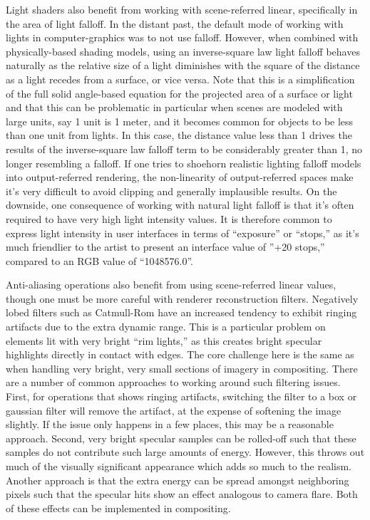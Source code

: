 Light shaders also benefit from working with scene-referred linear, specifically in the area of light falloff. In the distant past, the default mode of working with lights in computer-graphics was to not use falloff. However, when combined with physically-based shading models, using an inverse-square law light falloff behaves naturally as the relative size of a light diminishes with the square of the distance as a light recedes from a surface, or vice versa. Note that this is a simplification of the full solid angle-based equation for the projected area of a surface or light and that this can be problematic in particular when scenes are modeled with large units, say 1 unit is 1 meter, and it becomes common for objects to be less than one unit from lights. In this case, the distance value less than 1 drives the results of the inverse-square law falloff term to be considerably greater than 1, no longer resembling a falloff. If one tries to shoehorn realistic lighting falloff models into output-referred rendering, the non-linearity of output-referred spaces make it’s very difficult to avoid clipping and generally implausible results. On the downside, one consequence of working with natural light falloff is that it’s often required to have very high light intensity values. It is therefore common to express light intensity in user interfaces in terms of “exposure” or “stops,” as it’s much friendlier to the artist to present an interface value of ”+20 stops,” compared to an RGB value of “1048576.0”.

Anti-aliasing operations also benefit from using scene-referred linear values, though one must be more careful with renderer reconstruction filters. Negatively lobed filters such as Catmull-Rom have an increased tendency to exhibit ringing artifacts due to the extra dynamic range. This is a particular problem on elements lit with very bright “rim lights,” as this creates bright specular highlights directly in contact with edges. The core challenge here is the same as when handling very bright, very small sections of imagery in compositing. There are a number of common approaches to working around such filtering issues. First, for operations that shows ringing artifacts, switching the filter to a box or gaussian filter will remove the artifact, at the expense of softening the image slightly. If the issue only happens in a few places, this may be a reasonable approach. Second, very bright specular samples can be rolled-off such that these samples do not contribute such large amounts of energy. However, this throws out much of the visually significant appearance which adds so much to the realism. Another approach is that the extra energy can be spread amongst neighboring pixels such that the specular hits show an effect analogous to camera flare. Both of these effects can be implemented in compositing.

